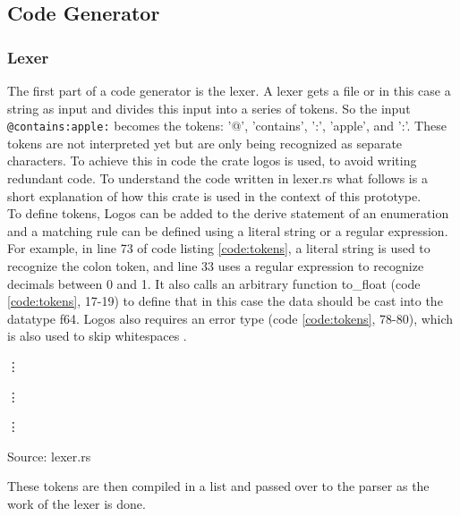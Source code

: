 \subsection{Code Generator}
\subsubsection{Lexer}
The first part of a code generator is the lexer. A lexer gets a file or in this case a string as input and divides this input into a series of tokens. So the input \lstinline[language=Fulltext-Search]$@contains:apple:$ becomes the tokens: '@', 'contains', ':', 'apple', and ':'. These tokens are not interpreted yet but are only being recognized as separate characters. To achieve this in code the crate logos is used, to avoid writing redundant code. To understand the code written in lexer.rs what follows is a short explanation of how this crate is used in the context of this prototype.\\
To define tokens, Logos can be added to the derive statement of an enumeration and a matching rule can be defined using a literal string or a regular expression. For example, in line 73 of code listing \ref{code:tokens}, a literal string is used to recognize the colon token, and line 33 uses a regular expression to recognize decimals between 0 and 1. It also calls an arbitrary function to\_float (code \ref{code:tokens}, 17-19) to define that in this case the data should be cast into the datatype f64. Logos also requires an error type (code \ref{code:tokens}, 78-80), which is also used to skip whitespaces \parencite[cf.][n.p.]{hirsz_logos_2022}.
\begin{codeenv}
    \label{code:tokens}
    
    \vdots
    
    \vdots
    
    \vdots
    
    \centerline{Source: lexer.rs}
\end{codeenv}
These tokens are then compiled in a list and passed over to the parser as the work of the lexer is done.
